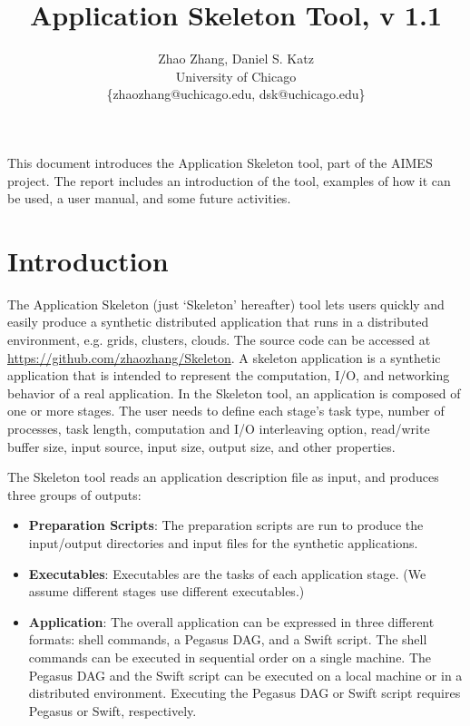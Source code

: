 \documentclass[10pt,a4paper]{article}
\title{Application Skeleton Tool, v 1.1}
\author{Zhao Zhang, Daniel S. Katz \\
University of Chicago \\
\{zhaozhang@uchicago.edu, dsk@uchicago.edu\}}
\begin{document}
\maketitle


This document introduces the Application Skeleton tool, part of the AIMES project. The report includes an introduction of the tool, examples of how it can be used, a user manual, and some future activities.

\newpage

\tableofcontents

\newpage

\section{Introduction}

The Application Skeleton (just `Skeleton' hereafter) tool \cite{Skeleton2013, Skeleton2014} lets users quickly and easily produce a synthetic distributed application that runs in a distributed environment, e.g. grids, clusters, clouds. The source code can be accessed at \url{https://github.com/zhaozhang/Skeleton}.
A skeleton application is a synthetic application that is intended to represent the computation, I/O, and networking behavior of a real application.
In the Skeleton tool, an application is composed of one or more stages.
The user needs to define each stage's task type, number of processes, task length, computation and I/O interleaving option, read/write buffer size, input source, input size, output size, and other properties.

The Skeleton tool reads an application description file as input, and produces three groups of outputs: 
\begin{itemize}

\item[] \textbf{Preparation Scripts}: The preparation scripts are run to produce the input/output directories and input files for the synthetic applications.

\item[] \textbf{Executables}: Executables are the tasks of each application stage. (We assume different stages use different executables.)

\item[] \textbf{Application}: The overall application can be expressed in three different formats: shell commands, a Pegasus DAG, and a Swift script.
The shell commands can be executed in sequential order on a single machine.
The Pegasus DAG and the Swift script can be executed on a local machine or in a distributed environment.
Executing the Pegasus DAG or Swift script requires Pegasus or Swift, respectively.

\end{itemize}
\end{document}
